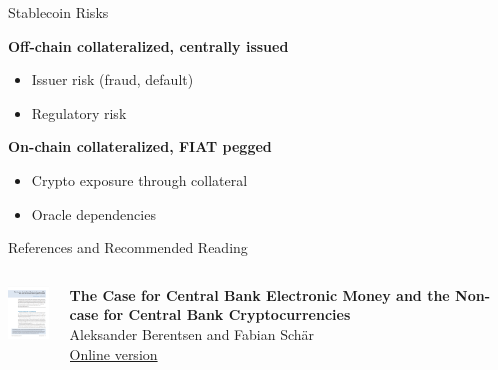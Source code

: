 \documentclass[handout]{beamer}
\begin{document}
\begin{frame}{Stablecoin Risks}

\textbf{Off-chain collateralized, centrally issued}
\begin{itemize}
	\item Issuer risk (fraud, default)
	\item Regulatory risk
\end{itemize}
\vspace{2em}


\textbf{On-chain collateralized, FIAT pegged}
\begin{itemize}
	\item Crypto exposure through collateral
	\item Oracle dependencies
\end{itemize}

\vspace{2em}

\end{frame}


\begin{frame}{References and Recommended Reading}
		\begin{columns}[T]
			\begin{column}{0.1\textwidth}
					\includegraphics[width = 1.7cm, frame]{../assets/images/berentsen_schaer}
			\end{column} %
			\begin{column}{0.8\textwidth}
				\textbf{The Case for Central Bank Electronic Money and the Non-case for Central Bank Cryptocurrencies} \\ 
				Aleksander Berentsen and Fabian Schär \\
				\link \href{https://research.stlouisfed.org/publications/review/2018/02/13/the-case-for-central-bank-electronic-money-and-the-non-case-for-central-bank-cryptocurrencies}{Online version}
			\end{column}
		\end{columns}
	
\end{frame}
\end{document}
